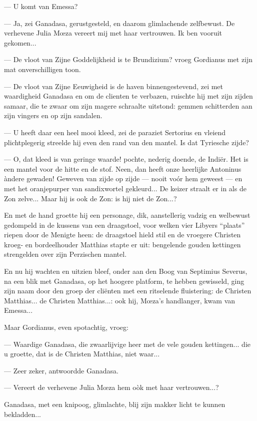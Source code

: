 \documentclass[a4paper, 12pt, oneside, dutch]{article}
\begin{document}
--- U komt van Emessa?

--- Ja, zei Ganadasa, gerustgesteld, en daarom glimlachende zelfbewust. De verhevene Julia Mœza vereert mij met haar vertrouwen. Ik ben vooruit gekomen...

--- De vloot van Zijne Goddelijkheid is te Brundizium? vroeg Gordianus met zijn mat onverschilligen toon.

--- De vloot van Zijne Eeuwigheid is de haven binnengestevend, zei met waardigheid Ganadasa en om de clienten te verbazen, ruischte hij met zijn zijden samaar, die te zwaar om zijn magere schraalte uitstond: gemmen schitterden aan zijn vingers en op zijn sandalen.

--- U heeft daar een heel mooi kleed, zei de paraziet Sertorius en vleiend plichtplegerig streelde hij even den rand van den mantel. Is dat Tyriesche zijde?

--- O, dat kleed is van geringe waarde! pochte, nederig doende, de Indiër. Het is een mantel voor de hitte en de stof. Neen, dan heeft onze heerlijke Antoninus àndere gewaden! Geweven van zijde op zijde --- nooit voór hem geweest --- en met het oranjepurper van sandixwortel gekleurd... De keizer straalt er in als de Zon zelve... Maar hij is ook de Zon: is hij niet de Zon...?

En met de hand groette hij een personage, dik, aanstellerig vadzig en welbewust gedompeld in de kussens van een draagstoel, voor welken vier Libyers "`plaats"' riepen door de Menigte heen: de draagstoel hield stil en de vroegere Christen kroeg- en bordeelhouder Matthias stapte er uit: bengelende gouden kettingen strengelden over zijn Perzischen mantel.

En nu hij wachten en uitzien bleef, onder aan den Boog van Septimius Severus, na een blik met Ganadasa, op het hoogere platform, te hebben gewisseld, ging zijn naam door den groep der cliënten met een ritselende fluistering: de Christen Matthias... de Christen Matthias...: ook hij, Mœza's handlanger, kwam van Emessa...

Maar Gordianus, even spotachtig, vroeg:

--- Waardige Ganadasa, die zwaarlijvige heer met de vele gouden kettingen... die u groette, dat is de Christen Matthias, niet waar...

--- Zeer zeker, antwoordde Ganadasa.

--- Vereert de verhevene Julia Mœza hem oòk met haar vertrouwen...?

Ganadasa, met een knipoog, glimlachte, blij zijn makker licht te kunnen bekladden...
\end{document}
